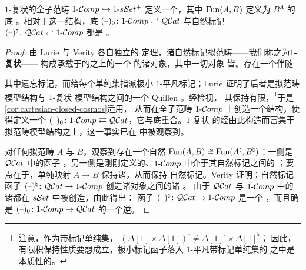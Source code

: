\begin{proposition}\label{prop:one-complicial-cosmos}
$1$-复状\trSimplicialSet{}的全子范畴 $1\text{-}\mathcal{C}omp\hookrightarrow1\text{-}s\mathcal{S}et^{+}$ 定义一个\trCartesianClosed{}\trInfinityCosmos，其中%
\trFunctorSpace{} $\operatorname{Fun}(A,B)$ 定义为\trInternalHom{} $B^{A}$ 的底%
\trQuasiCategory。相对于这一\trInfinityCosmos{}结构，底\trQuasiCategory{}%
\trFunctor{} $(\text{--})_{0}\colon1\text{-}\mathcal{C}omp\rightleftarrows\mathcal{Q}\mathcal{C}at$ 与自然标记%
\trFunctor{} $(\text{--})^{\natural}\colon\mathcal{Q}\mathcal{C}at\rightleftarrows1\text{-}\mathcal{C}omp$ 都是%
\trCosmological。
\end{proposition}
\begin{proof}
由 Lurie \cite[\S3.1.3--4]{bib78} 与 Verity \cite[\S6.5]{bib129} 各自独立的
定理，诸自然标记拟范畴——我们称之为\textbf{$1$-复状\trSimplicialSet}——
构成承载于\trMarkedSimplicialSet{}的\trCategory{}之上的一个%
\trCartesianClosed{}\trModelStructure{}的诸\trFibrant{}对象，其中一切对象
皆\trCofibrant。存在一个伴随
\begin{center}
\end{center}
其中\trRightAdjoint{}遗忘标记，而\trLeftAdjoint{}给每个单纯集指派极小
$1$-平凡标记；Lurie 证明了后者是拟范畴模型结构与 $1$-复状\trSimplicialSet{}%
模型结构之间的一个 Quillen \trEquivalence{} \cite[3.1.5.1]{bib78}。经检视，
其\trLeftAdjoint{}保持有限\trProduct，\footnote{注意，作为带标记单纯集，
$(\Delta[1]\times\Delta[1])^{\flat}\ne\Delta[1]^{\flat}\times\Delta[1]^{\flat}$；
因此，有限积保持性质要想成立，极小标记函子落入 $1$-平凡带标记单纯集的%
\trCategory{}之中是本质性的。}于是\cref{cor:cartesian-closed-cosmos}适用，
从而在全子范畴 $1\text{-}\mathcal{C}omp$ 上创造一个\trCartesianClosed{}\trInfinityCosmos{}结构，使得\trForgetfulFunctor{}定义一个%
\trCosmologicalBiequivalence{} $(\text{--})_{0}\colon1\text{-}\mathcal{C}omp\rightleftarrows\mathcal{Q}\mathcal{C}at$，它与底\trQuasiCategory{}\trFunctor{}重合。$1$-复状\trSimplicialSet{}%
的\trModelCategory{}经由此构造而富集于拟范畴模型结构之上，这一事实已在
\cite[3.1.4.5]{bib78} 中被观察到。

对任何拟范畴 $A$ 与 $B$，观察到存在一个自然\trIsomorphism{}
$\operatorname{Fun}(A,B)\cong\operatorname{Fun}(A^{\natural},B^{\natural})$：一侧是 $\mathcal{Q}\mathcal{C}at$ 中的函子%
\trQuasiCategory，另一侧是刚刚定义的、$1\text{-}\mathcal{C}omp$ 中介于其自然标记之间的%
\trFunctorSpace；要点在于，单纯映射 $A\to B$ 保持诸\trIsomorphism，从而保持
自然标记。Verity 证明：自然标记函子 $(\text{--})^{\natural}\colon\mathcal{Q}\mathcal{C}at\to1\text{-}\mathcal{C}omp$ 创造诸\trFibrant{}对象之间的诸\trFibration{} \cite[114--118]{bib129}。
由于 $\mathcal{Q}\mathcal{C}at$ 与 $1\text{-}\mathcal{C}omp$ 中的诸\trLimit{}都在 $s\mathcal{S}et$ 中被创造，由此得出：
函子 $(\text{--})^{\natural}\colon\mathcal{Q}\mathcal{C}at\to1\text{-}\mathcal{C}omp$ 是一个%
\trCosmologicalBiequivalence，而且确是 $(\text{--})_{0}\colon1\text{-}\mathcal{C}omp\to\mathcal{Q}\mathcal{C}at$
的一个逆\trIsomorphism。
\end{proof}

